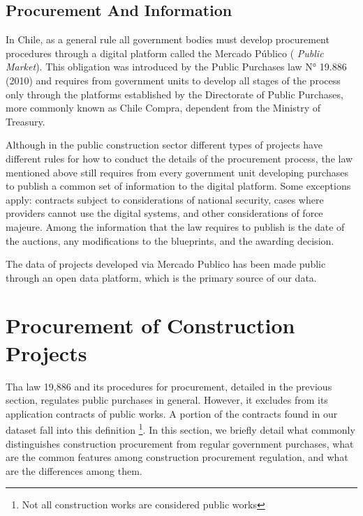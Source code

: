 \subsection{Procurement And Information}
In Chile, as a general rule all government bodies must develop procurement procedures through a digital platform called the Mercado Público ( \textit{Public Market}).  This obligation was introduced by the Public Purchases law N° 19.886 (2010) and requires from government units to develop all stages of the process only through the platforms established by the Directorate of Public Purchases, more commonly known as Chile Compra, dependent from the Ministry of Treasury.

Although in the public construction sector different types of projects have different rules for how to conduct the details of the procurement process, the law mentioned above still requires from every government unit developing purchases to publish a common set of information to the digital platform. Some exceptions apply: contracts subject to considerations of national security, cases where providers cannot use the digital systems, and other considerations of force majeure. Among the information that the law requires to publish is the date of the auctions, any modifications to the blueprints, and the awarding decision.

The data of projects developed via Mercado Publico has been made public through an open data platform, which is the primary source of our data.


\section{Procurement of Construction Projects}
Tha law 19,886 and its procedures for procurement, detailed in the previous section, regulates public purchases in general. However, it excludes from its application contracts of public works. A portion of the contracts found in our dataset fall into this definition \footnote{Not all construction works are considered public works}. In this section, we briefly detail what commonly distinguishes construction procurement from regular government purchases, what are the common features among construction procurement regulation, and what are the differences among them.

